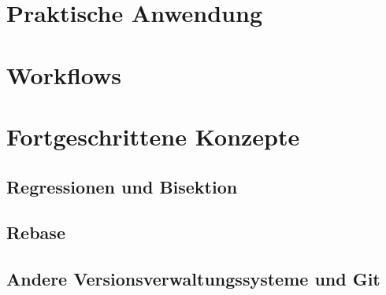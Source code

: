\section{Praktische Anwendung}
\label{sec:Praxis}
\section{Workflows}
\label{sec:Workflows}
\section{Fortgeschrittene Konzepte}
\label{sec:FortgeschritteneKonzepte}
\subsection{Regressionen und Bisektion}
\label{sec:Regressionen}
\subsection{Rebase}
\label{sec:Rebase}
\subsection{Andere Versionsverwaltungssysteme und Git}
\label{sec:AndereVersionsverwaltungssystemeundGit}
